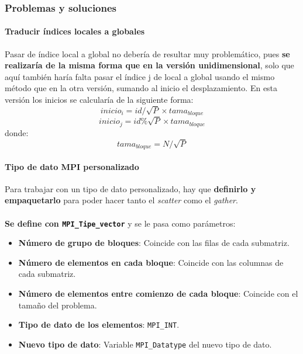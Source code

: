 \subsubsection{Problemas y soluciones}

\paragraph{Traducir índices locales a globales}

Pasar de índice local a global no debería de resultar muy problemático, pues \textbf{se realizaría de la misma forma que en la versión unidimensional}, solo que aquí también haría falta pasar el índice j de local a global usando el mismo método que en la otra versión, sumando al inicio el desplazamiento. En esta versión los inicios se calcularía de la siguiente forma:
\[ inicio_i = id / \sqrt{P} \times tama_{bloque}  \]
\[ inicio_j = id \% \sqrt{P} \times tama_{bloque}  \]
donde:
\[ tama_{bloque} = N / \sqrt{P} \]

\paragraph{Tipo de dato MPI personalizado}

Para trabajar con un tipo de dato personalizado, hay que \textbf{definirlo y empaquetarlo} para poder hacer tanto el \textit{scatter} como el \textit{gather}.
\\ \\
\textbf{Se define con \texttt{MPI\_Tipe\_vector}} y se le pasa como parámetros:
\begin{itemize}
	\item \textbf{Número de grupo de bloques}: Coincide con las filas de cada submatriz.
	\item \textbf{Número de elementos en cada bloque}: Coincide con las columnas de cada submatriz.
	\item \textbf{Número de elementos entre comienzo de cada bloque}: Coincide con el tamaño del problema.
	\item \textbf{Tipo de dato de los elementos}: \texttt{MPI\_INT}.
	\item \textbf{Nuevo tipo de dato}: Variable \texttt{MPI\_Datatype} del nuevo tipo de dato.
\end{itemize}

